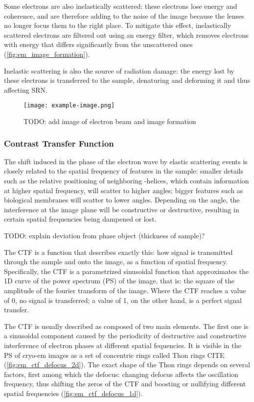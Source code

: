 Some electrons are also inelastically scattered: these electrons lose energy and coherence, and are therefore adding to the noise of the image because the lenses no longer focus them to the right place.
To mitigate this effect, inelastically scattered electrons are filtered out using an energy filter, which removes electrons with energy that differs significantly from the unscattered ones (\autoref{fig:em_image_formation}).

Inelastic scattering is also the source of radiation damage: the energy lost by these electrons is transferred to the sample, denaturing and deforming it and thus affecting SRN.

\begin{figure}[ht]
    \centering
    \texttt{[image: example-image.png]}
    \caption[Image formation in cryo-EM]{TODO: add image of electron beam and image formation}
    \label{fig:em_image_formation}
\end{figure}

\subsubsection{Contrast Transfer Function}\label{em_ctf}
The shift induced in the phase of the electron wave by elastic scattering events is closely related to the spatial frequency of features in the sample: smaller details such as the relative positioning of neighboring \alpha-helices, which contain information at higher spatial frequency, will scatter to higher angles; bigger features such as biological membranes will scatter to lower angles.
Depending on the angle, the interference at the image plane will be constructive or destructive, resulting in certain spatial frequencies being dampened or lost.

TODO: explain deviation from phase object (thickness of sample)?

The CTF is a function that describes exactly this: how signal is transmitted through the sample and onto the image, as a function of spatial frequency.
Specifically, the CTF is a parametrized sinusoidal function that approximates the 1D curve of the power spectrum (PS) of the image, that is: the square of the amplitude of the fourier transform of the image.
Where the CTF reaches a value of \num{0}, no signal is transferred; a value of \num{1}, on the other hand, is a perfect signal transfer.

The CTF is usually described as composed of two main elements.
The first one is a sinusoidal component caused by the periodicity of destructive and constructive interference of electron phases at different spatial fequencies.
It is visible in the PS of cryo-em images as a set of concentric rings called Thon rings CITE (\autoref{fig:em_ctf_defocus_2d}).
The exact shape of the Thon rings depends on several factors, first among which the defocus: changing defocus affects the oscillation frequency, thus shifting the zeros of the CTF and boosting or nullifying different spatial frequencies (\autoref{fig:em_ctf_defocus_1d}).

